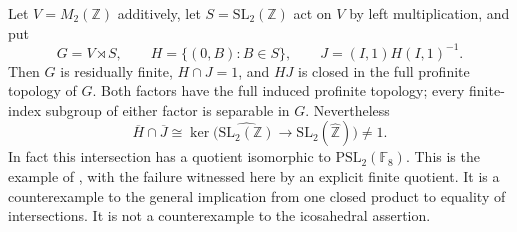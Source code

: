 Let $V=M_2(\mathbb Z)$ additively, let $S=\mathrm{SL}_2(\mathbb Z)$
act on $V$ by left multiplication, and put
\[
 G=V\rtimes S,
 \qquad H=\{(0,B):B\in S\},
 \qquad J=(I,1)H(I,1)^{-1}.
\]
Then $G$ is residually finite, $H\cap J=1$, and $HJ$ is
closed in the full profinite topology of $G$.
Both factors have the full induced profinite topology; every
finite-index subgroup of either factor is separable in $G$.
Nevertheless
\[
 \overline H\cap\overline J
 \cong\ker\bigl(\widehat{\mathrm{SL}_2(\mathbb Z)}
          \longrightarrow\mathrm{SL}_2(\widehat{\mathbb Z})\bigr)
 \ne1.
\]
In fact this intersection has a quotient isomorphic to
$\mathrm{PSL}_2(\mathbb F_8)$.
This is the example of \citet[Example 4.1]{DE_Minasyan2023},
with the failure witnessed here by an explicit finite quotient.
It is a counterexample to the general implication from one
closed product to equality of intersections.  It is not a
counterexample to the icosahedral assertion.
